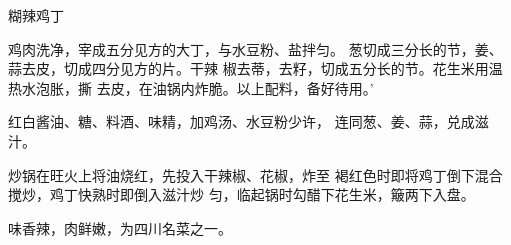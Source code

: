 \begin{recipe}[原宫保鸡丁]{糊辣鸡丁}



\ingredients



\cooking

\step 	鸡肉洗净，宰成五分见方的大丁，与水豆粉、盐拌匀。 葱切成三分长的节，姜、蒜去皮，切成四分见方的片。干辣 椒去蒂，去籽，切成五分长的节。花生米用温热水泡胀，撕 去皮，在油锅内炸脆。以上配料，备好待用。’

\step 	红白酱油、糖、料酒、味精，加鸡汤、水豆粉少许， 连同葱、姜、蒜，兑成滋汁。

\step 	炒锅在旺火上将油烧红，先投入干辣椒、花椒，炸至 褐红色时即将鸡丁倒下混合搅炒，鸡丁快熟时即倒入滋汁炒 匀，临起锅时勾醋下花生米，簸两下入盘。

\notes

味香辣，肉鲜嫩，为四川名菜之一。

\end{recipe}

